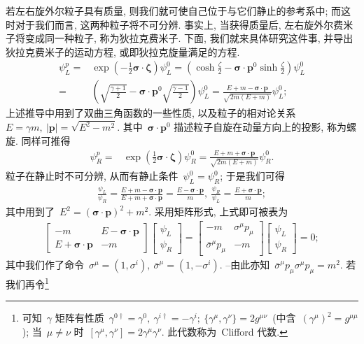 若左右旋外尔粒子具有质量, 则我们就可使自己位于与它们静止的参考系中; 而这时对于我们而言, 这两种粒子将不可分辨. 事实上, 当获得质量后, 左右旋外尔费米子将变成同一种粒子, 称为狄拉克费米子. 下面, 我们就来具体研究这件事, 并导出狄拉克费米子的运动方程, 或即狄拉克旋量满足的方程.
\begin{align}
\psi_L^p=&\exp\left(-\frac{1}{2}\bm{\sigma}\cdot\bm{\zeta}\right)\psi_L^0=\left(\cosh\frac{\zeta}{2}-\bm{\sigma}\cdot\bm{p}^0\sinh\frac{\zeta}{2}\right)\psi_L^0\nonumber\\
=&\left(\sqrt{\frac{\gamma+1}{2}}-\bm{\sigma}\cdot\bm{p}^0\sqrt{\frac{\gamma-1}{2}}\right)\psi_L^0=\frac{E+m-\bm{\sigma}\cdot\bm{p}}{\sqrt{2m(E+m)}}\psi_L^0;
\end{align}
上述推导中用到了双曲三角函数的一些性质, 以及粒子的相对论关系~$E=\gamma m,~|\bm{p}|=\sqrt{E^2-m^2}$. 其中~$\bm{\sigma}\cdot\bm{p}^0$ 描述粒子自旋在动量方向上的投影, 称为螺旋. 同样可推得
\begin{align}
\psi_R^p=&\exp\left(\frac{1}{2}\bm{\sigma}\cdot\bm{\zeta}\right)\psi_R^0=\frac{E+m+\bm{\sigma}\cdot\bm{p}}{\sqrt{2m(E+m)}}\psi_R^0.
\end{align}
粒子在静止时不可分辨, 从而有静止条件~$\psi_L^0=\psi_R^0$; 于是我们可得
\begin{align}
\frac{\psi_L}{\psi_R}=\frac{E+m-\bm{\sigma}\cdot\bm{p}}{E+m+\bm{\sigma}\cdot\bm{p}}=\frac{E-\bm{\sigma}\cdot\bm{p}}{m},~\frac{\psi_R}{\psi_L}=\frac{E+\bm{\sigma}\cdot\bm{p}}{m};
\end{align}
其中用到了~$E^2=(\bm{\sigma}\cdot\bm{p})^2+m^2$. 采用矩阵形式, 上式即可被表为
\begin{align}
\left[\begin{array}{cc}
-m&E-\bm{\sigma}\cdot\bm{p}\\
E+\bm{\sigma}\cdot\bm{p}&-m
\end{array}\right]
\left[\begin{array}{c}\psi_L\\\psi_R\end{array}\right]=
\left[\begin{array}{cc}
-m&\sigma^\mu p_\mu\\
\bar{\sigma}^\mu p_\mu&-m
\end{array}\right]
\left[\begin{array}{c}\psi_L\\\psi_R\end{array}\right]
=0;
\end{align}
其中我们作了命令~$\sigma^\mu=(1,\sigma^i),~\bar{\sigma}^\mu=(1,-\sigma^i)$. --由此亦知~$\bar{\sigma}^\mu p_\mu\sigma^\mu p_\mu=m^2$. 若我们再令\footnote{可知~$\gamma$ 矩阵有性质~$\gamma^{0\dag}=\gamma^0,~\gamma^{i\dag}=-\gamma^i;~\{\gamma^\mu,\gamma^\nu\}=2g^{\mu\nu}$~(中含~$(\gamma^\mu)^2=g^{\mu\mu}$); 当~$\mu\neq\nu$ 时~$[\gamma^\mu,\gamma^\nu]=2\gamma^\mu\gamma^\nu$. 此代数称为~Clifford 代数.}
